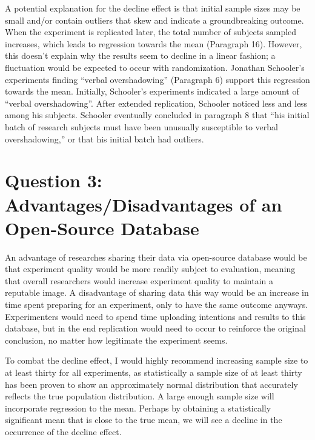A potential explanation for the decline effect is that initial sample
sizes may be small and/or contain outliers that skew and indicate a
groundbreaking outcome. When the experiment is replicated later, the
total number of subjects sampled increases, which leads to regression
towards the mean (Paragraph 16). However, this doesn't explain why the
results seem to decline in a linear fashion; a fluctuation would be
expected to occur with randomization. Jonathan Schooler's experiments
finding ``verbal overshadowing'' (Paragraph 6) support this regression
towards the mean. Initially, Schooler's experiments indicated a large
amount of ``verbal overshadowing''. After extended replication, Schooler
noticed less and less among his subjects. Schooler eventually concluded
in paragraph 8 that ``his initial batch of research subjects must have
been unusually susceptible to verbal overshadowing,'' or that his
initial batch had outliers.

\section{\textbf{Question 3: Advantages/Disadvantages of an Open-Source
Database}}\label{question-3-advantagesdisadvantages-of-an-open-source-database}

An advantage of researches sharing their data via open-source database
would be that experiment quality would be more readily subject to
evaluation, meaning that overall researchers would increase experiment
quality to maintain a reputable image. A disadvantage of sharing data
this way would be an increase in time spent preparing for an experiment,
only to have the same outcome anyways. Experimenters would need to spend
time uploading intentions and results to this database, but in the end
replication would need to occur to reinforce the original conclusion, no
matter how legitimate the experiment seems.

To combat the decline effect, I would highly recommend increasing sample
size to at least thirty for all experiments, as statistically a sample
size of at least thirty has been proven to show an approximately normal
distribution that accurately reflects the true population distribution.
A large enough sample size will incorporate regression to the mean.
Perhaps by obtaining a statistically significant mean that is close to
the true mean, we will see a decline in the occurrence of the decline
effect.
